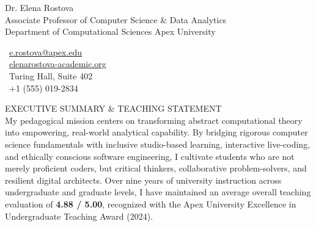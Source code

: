 \documentclass[11pt,a4paper]{article}
\begin{document}
\begin{tcolorbox}[
  enhanced,
  colback=PrimaryNavy,
  colframe=PrimaryNavy,
  arc=6pt,
  boxrule=0pt,
  top=12pt, bottom=12pt, left=14pt, right=14pt
]
  \begin{minipage}[c]{0.65\textwidth}
    {\fontsize{18}{21}\selectfont\color{white} Dr. Elena Rostova} \\[3pt]
    {\fontsize{10.5}{13}\selectfont\color{AccentGold!40!white} Associate Professor of Computer Science \& Data Analytics} \\[2pt]
    {\fontsize{9}{11}\selectfont\color{white!85} Department of Computational Sciences \textperiodcentered{} Apex University}
  \end{minipage}%
  \hfill
  \begin{minipage}[c]{0.33\textwidth}
    \raggedleft
    {\fontsize{8.5}{11}\selectfont\color{white!90}
      \faEnvelope\ \href{mailto:e.rostova@apex.edu}{\color{white}e.rostova@apex.edu} \\
      \faGlobe\ \href{https://www.elenarostova-academic.org}{\color{white}elenarostova-academic.org} \\
      \faBuilding\ Turing Hall, Suite 402 \\
      \faPhone\ +1 (555) 019-2834
    }
  \end{minipage}
\end{tcolorbox}

\vspace{-2pt}

\begin{tcolorbox}[
  enhanced,
  colback=HighlightBg,
  colframe=AccentTeal,
  arc=4pt,
  boxrule=0.8pt,
  top=7pt, bottom=7pt, left=11pt, right=11pt
]
  {\fontsize{9}{11}\selectfont\color{AccentTeal} EXECUTIVE SUMMARY \& TEACHING STATEMENT} \\[3pt]
  {\color{NeutralDark}\small
    My pedagogical mission centers on transforming abstract computational theory into empowering, real-world analytical capability. By bridging rigorous computer science fundamentals with inclusive studio-based learning, interactive live-coding, and ethically conscious software engineering, I cultivate students who are not merely proficient coders, but critical thinkers, collaborative problem-solvers, and resilient digital architects. Over nine years of university instruction across undergraduate and graduate levels, I have maintained an average overall teaching evaluation of \textbf{4.88 / 5.00}, recognized with the Apex University Excellence in Undergraduate Teaching Award (2024).
  }
\end{tcolorbox}
\end{document}
